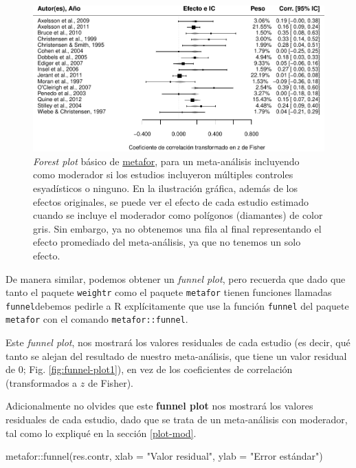 \documentclass[
  bookmarksnumbered]{article}
\newenvironment{Shaded}{\begin{snugshade}}{\end{snugshade}}
\newcommand{\AttributeTok}[1]{\textcolor[rgb]{0.00,0.34,0.68}{#1}}
\newcommand{\FunctionTok}[1]{\textcolor[rgb]{0.39,0.29,0.61}{#1}}
\newcommand{\NormalTok}[1]{\textcolor[rgb]{0.12,0.11,0.11}{#1}}
\newcommand{\SpecialCharTok}[1]{\textcolor[rgb]{0.24,0.68,0.91}{#1}}
\newcommand{\StringTok}[1]{\textcolor[rgb]{0.75,0.01,0.01}{#1}}
\begin{document}
\begin{figure}
\centering
\includegraphics{Meta-analysis_files/figure-latex/for-plot-mod2-1.pdf}
\caption{\label{fig:for-plot-mod2}\emph{Forest plot} básico de \href{https://www.metafor-project.org/doku.php}{metafor}, para un meta-análisis incluyendo como moderador si los estudios incluyeron múltiples controles esyadísticos o ninguno. En la ilustración gráfica, además de los efectos originales, se puede ver el efecto de cada estudio estimado cuando se incluye el moderador como polígonos (diamantes) de color gris. Sin embargo, ya no obtenemos una fila al final representando el efecto promediado del meta-análisis, ya que no tenemos un solo efecto.}
\end{figure}

De manera similar, podemos obtener un \emph{funnel plot}, pero recuerda que dado que tanto el paquete \texttt{weightr} como el paquete \texttt{metafor} tienen funciones llamadas \texttt{funnel}debemos pedirle a R explícitamente que use la función \texttt{funnel} del paquete \texttt{metafor} con el comando \texttt{metafor::funnel}.

Este \emph{funnel plot}, nos mostrará los valores residuales de cada estudio (es decir, qué tanto se alejan del resultado de nuestro meta-análisis, que tiene un valor residual de 0; Fig. \ref{fig:funnel-plot1}), en vez de los coeficientes de correlación (transformados a \(z\) de Fisher).

Adicionalmente no olvides que este \textbf{funnel plot} nos mostrará los valores residuales de cada estudio, dado que se trata de un meta-análisis con moderador, tal como lo expliqué en la sección \ref{plot-mod}.

\begin{Shaded}
\begin{Highlighting}[]
\NormalTok{metafor}\SpecialCharTok{::}\FunctionTok{funnel}\NormalTok{(res.contr,}
                \AttributeTok{xlab =} \StringTok{"Valor residual"}\NormalTok{,}
                \AttributeTok{ylab =} \StringTok{"Error estándar"}\NormalTok{)}
\end{Highlighting}
\end{Shaded}
\end{document}

